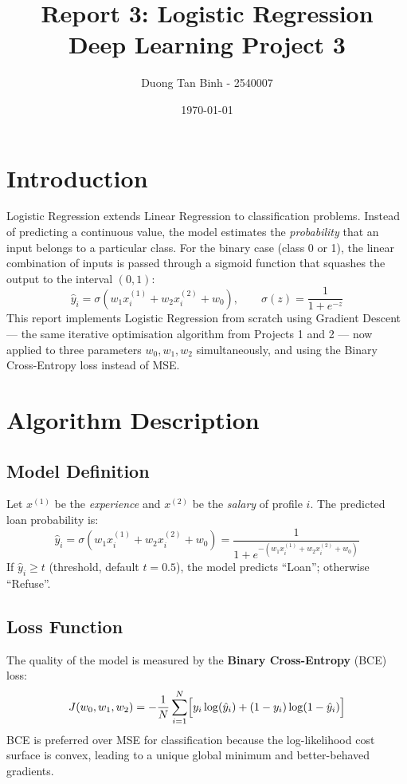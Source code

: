 \documentclass[12pt,a4paper]{article}
\title{\textbf{Report 3: Logistic Regression} \\ \large Deep Learning Project 3}
\author{Duong Tan Binh - 2540007}
\date{\today}
\begin{document}
\maketitle
\tableofcontents
\newpage

\section{Introduction}

Logistic Regression extends Linear Regression to classification problems. Instead of predicting a continuous value, the model estimates the \emph{probability} that an input belongs to a particular class. For the binary case (class 0 or 1), the linear combination of inputs is passed through a sigmoid function that squashes the output to the interval $(0,1)$:
\[
    \hat{y}_i = \sigma\!\left(w_1 x_i^{(1)} + w_2 x_i^{(2)} + w_0\right), \qquad
    \sigma(z) = \frac{1}{1 + e^{-z}}
\]
This report implements Logistic Regression from scratch using Gradient Descent --- the same iterative optimisation algorithm from Projects 1 and 2 --- now applied to three parameters $w_0, w_1, w_2$ simultaneously, and using the Binary Cross-Entropy loss instead of MSE.

\section{Algorithm Description}

\subsection{Model Definition}

Let $x^{(1)}$ be the \emph{experience} and $x^{(2)}$ be the \emph{salary} of profile $i$. The predicted loan probability is:
\[
    \hat{y}_i = \sigma\!\left(w_1 x_i^{(1)} + w_2 x_i^{(2)} + w_0\right)
    = \frac{1}{1 + e^{-(w_1 x_i^{(1)} + w_2 x_i^{(2)} + w_0)}}
\]
If $\hat{y}_i \geq t$ (threshold, default $t = 0.5$), the model predicts ``Loan''; otherwise ``Refuse''.

\subsection{Loss Function}

The quality of the model is measured by the \textbf{Binary Cross-Entropy} (BCE) loss:
\[
    J(w_0, w_1, w_2) = -\frac{1}{N} \sum_{i=1}^{N}
    \Bigl[ y_i \log(\hat{y}_i) + (1 - y_i) \log(1 - \hat{y}_i) \Bigr]
\]
BCE is preferred over MSE for classification because the log-likelihood cost surface is convex, leading to a unique global minimum and better-behaved gradients.
\end{document}
